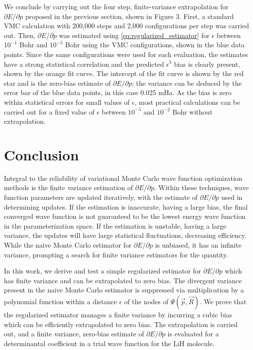 \documentclass[twocolumn]{revtex4-1}
\begin{document}
We conclude by carrying out the four step, finite-variance extrapolation for $\partial E/\partial p$ proposed in the previous section, shown in Figure 3.
First, a standard VMC calculation with 200,000 steps and 2,000 configurations per step was carried out.
Then, $\partial E/\partial p$ was estimated using \eqref{eq:regularized_estimator} for $\epsilon$ between $10^{-1}$ Bohr and $10^{-5}$ Bohr using the VMC configurations, shown in the blue data points.
Since the same configurations were used for each evaluation, the estimates have a strong statistical correlation and the predicted $\epsilon^3$ bias is clearly present, shown by the orange fit curve.
The intercept of the fit curve is shown by the red star and is the zero-bias estimate of $\partial E/\partial p$; the variance can be deduced by the error bar of the blue data points, in this case 0.025 mHa.
As the bias is zero within statistical errors for small values of $\epsilon$, most practical calculations can be carried out for a fixed value of $\epsilon$ between $10^{-5}$ and $10^{-2}$ Bohr without extrapolation.

\section{Conclusion}
Integral to the reliability of variational Monte Carlo wave function optimization methods is the finite variance estimation of $\partial E/\partial p$.
Within these techniques, wave function parameters are updated iteratively, with the estimate of $\partial E/\partial p$ used in determining updates.
If the estimation is inaccurate, having a large bias, the final converged wave function is not guaranteed to be the lowest energy wave function in the parameterization space.
If the estimation is unstable, having a large variance, the updates will have large statistical fluctuations, decreasing efficiency.
While the naive Monte Carlo estimator for $\partial E/\partial p$ is unbiased, it has an infinite variance, prompting a search for finite variance estimators for the quantity.

In this work, we derive and test a simple regularized estimator for $\partial E/\partial p$ which has finite variance and can be extrapolated to zero bias.
The divergent variance present in the naive Monte Carlo estimator is suppressed via multiplication by a polynomial function within a distance $\epsilon$ of the nodes of $\Psi(\vec{p}, \vec{R})$. 
We prove that the regularized estimator manages a finite variance by incurring a cubic bias which can be efficiently extrapolated to zero bias.
The extrapolation is carried out, and a finite variance, zero-bias estimate of $\partial E/\partial p$ is evaluated for a determinantal coefficient in a trial wave function for the LiH molecule.



\end{document}
